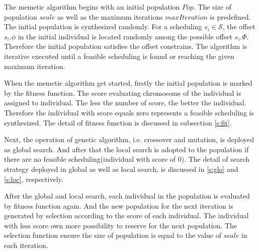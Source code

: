 \documentclass[journal]{IEEEtran}
\newcommand{\calS}{\mathcal{S}}
\begin{document}
The memetic algorithm begins with an initial population $Pop$. The size of population $scale$ as well as the maximum iterations $maxIteration$ is predefined.
The initial population is synthesized randomly.
For a scheduling $s_{i}\in\calS$,
 the offset $s_i.\phi$ in the initial individual is located randomly among the possible offset $s_i.\Phi$.
Therefore the initial population satisfies the offset constrains.
The algorithm is iterative executed until a feasible scheduling is found or reaching the given maximum iteration.

When the memetic algorithm get started, firstly the initial population is marked by the fitness function.
The score evaluating chromosome of the individual is assigned to individual.
The less the number of score, the better the individual.
Therefore the individual with score equals zero represents a feasible scheduling is synthesized.
The detail of fitness function is discussed in subsection \ref{s:fit}.

Next, the operation of genetic algorithm,
 i.e. crossover and mutation,
  is deployed as global search.
And after that the local search is adopted to the population if there are no feasible scheduling(individual with score of 0).
The detail of search strategy deployed in global as well as local search, is discussed in \ref{s:glo} and \ref{s:loc}, respectively.

After the global and local search,
 each individual in the population is evaluated by fitness function again.
And the new population for the next iteration is generated by selection according to the score of each individual.
The individual with less score own more possibility to reserve for the next population.
The selection function ensure the size of population is equal to the value of $scale$ in each iteration.
\end{document}
